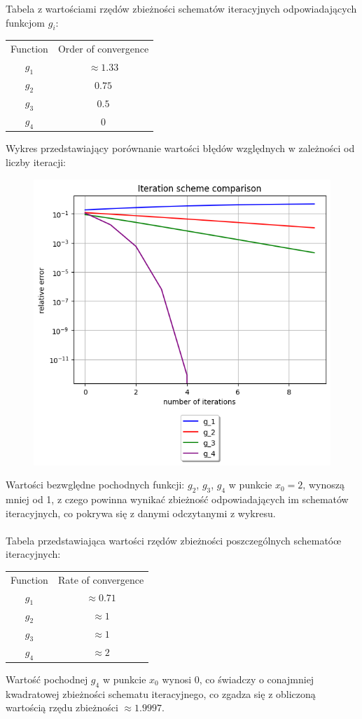 \documentclass{article}
\begin{document}
Tabela z wartościami rzędów zbieżności schematów iteracyjnych 
odpowiadających funkcjom $g_i$:
\begin{center}
  \begin{tabular}{c c} 
   Function & Order of convergence\\
   $g_1$ & $\approx 1.33$\\
   $g_2$ & $0.75$\\
   $g_3$ & $0.5$\\
   $g_4$ & $0$
  \end{tabular}
\end{center}
Wykres przedstawiający porównanie wartości błędów względnych w zależności od liczby
iteracji:
\begin{figure}[H]
  \includegraphics[width=\linewidth]{figures/iteration.png}
\end{figure}

Wartości bezwględne pochodnych funkcji: $g_2$, $g_3$, $g_4$ w punkcie $x_0=2$, wynoszą mniej od 1, z czego
powinna wynikać zbieżność odpowiadających im schematów iteracyjnych,
co pokrywa się z danymi odczytanymi z wykresu. \\\\
Tabela przedstawiająca wartości rzędów zbieżności poszczególnych schematóœ
iteracyjnych:
\begin{center}
  \begin{tabular}{c c} 
   Function & Rate of convergence\\
   $g_1$ & $\approx 0.71$\\
   $g_2$ & $\approx 1$\\
   $g_3$ & $\approx 1$\\
   $g_4$ & $\approx 2$
  \end{tabular}
\end{center}
\null\quad
Wartość pochodnej $g_4$ w punkcie $x_0$ wynosi 0, co świadczy o conajmniej kwadratowej zbieżności
schematu iteracyjnego, co zgadza się z obliczoną wartością rzędu zbieżności $\approx 1.9997$.
\end{document}
